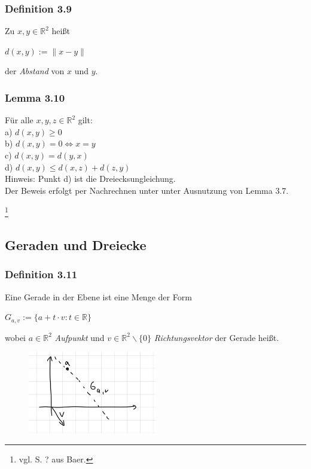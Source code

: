 \documentclass{article}
\begin{document}
\subsubsection*{Definition 3.9}
Zu $x,y \in \mathbb{R}^2$ heißt \\
\begin{center}
    $d(x,y) := \|x-y\|$
\end{center}
der \textit{Abstand} von $x$ und $y$. \\

\subsubsection*{Lemma 3.10}
Für alle $x,y,z \in \mathbb{R}^2$ gilt: \\
a) $d(x,y) \geq 0$ \\
b) $d(x,y) = 0 \Leftrightarrow x = y$ \\
c) $d(x,y) = d(y,x)$ \\
d) $d(x,y) \leq d(x,z) + d(z,y)$ \\
Hinweis: Punkt d) ist die Dreiecksungleichung. \\
Der Beweis erfolgt per Nachrechnen unter unter Ausnutzung von Lemma 3.7. \\
\newpage
\date{Donnerstag, 30.11.23} \footnote{vgl. S. ? aus Baer.}
\subsection{Geraden und Dreiecke}
\subsubsection*{Definition 3.11}
Eine Gerade in der Ebene ist eine Menge der Form \\
\begin{center}
    $G_{a,v} := \{a + t \cdot v: t \in \mathbb{R}\}$ \\
\end{center}
wobei $a \in \mathbb{R}^2$ \textit{Aufpunkt} und $v \in \mathbb{R}^2\backslash\{0\}$ \textit{Richtungsvektor} der Gerade heißt. \\
\begin{figure}[h]
    \centering
    \includegraphics[width=0.5\textwidth]{Images/3.11.jpeg}

\end{figure}
\end{document}
